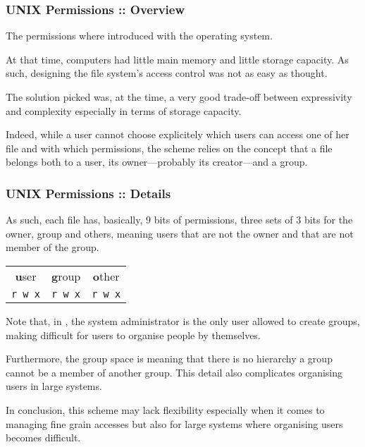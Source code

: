 \begin{frame}
  \frametitle{UNIX Permissions :: Overview}

  The  permissions where introduced with the 
  operating system.

  \-

  At that time, computers had little main memory and little storage capacity.
  As such, designing the file system's access control was not as easy as
  thought.

  \-

  The solution picked was, at the time, a very good trade-off between
  expressivity and complexity especially in terms of storage capacity.

  \-

  Indeed, while a user cannot choose explicitely which users can access one of
  her file and with which permissions, the  scheme relies on the
  concept that a file belongs both to a user, its owner---probably its
  creator---and a group.
\end{frame}


\begin{frame}[containsverbatim]
  \frametitle{UNIX Permissions :: Details}

  As such, each file has, basically, $9$ bits of permissions, three sets of
  $3$ bits  for the owner, group and others, meaning users that are
  not the owner and that are not member of the group.

  \-

  \begin{center}
    \begin{tabular}{ccc}
      \textbf{u}ser & \textbf{g}roup & \textbf{o}ther \\
      \verb|r w x| & \verb|r w x| & \verb|r w x| \\
    \end{tabular}
  \end{center}

  \-

  Note that, in , the system administrator is the only user allowed
  to create groups, making difficult for users to organise people by
  themselves.

  \-

  Furthermore, the group space is  meaning that there is no
  hierarchy \ie{} a group cannot be a member of another group. This detail
  also complicates organising users in large systems.

  \-

  In conclusion, this scheme may lack flexibility especially when it comes to
  managing fine grain accesses but also for large systems where organising
  users becomes difficult.
\end{frame}

